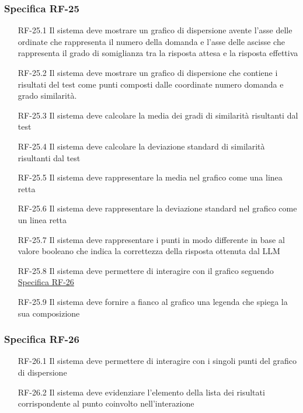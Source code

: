 \subsubsection{Specifica RF-25}
\label{subsubsec:RF-25}
\begin{enumerate}
    \item[RF-25.1] Il sistema deve mostrare un grafico di dispersione avente l'asse delle ordinate che rappresenta il numero della
     domanda e l'asse delle ascisse che rappresenta il grado di somiglianza tra la risposta attesa e la risposta effettiva
    \item[RF-25.2] Il sistema deve mostrare un grafico di dispersione che contiene i risultati del test come punti composti dalle coordinate numero domanda e grado similarità.
    \item[RF-25.3] Il sistema deve calcolare la media dei gradi di similarità risultanti dal test
    \item[RF-25.4] Il sistema deve calcolare la deviazione standard di similarità risultanti dal test
    \item[RF-25.5] Il sistema deve rappresentare la media nel grafico come una linea retta
    \item[RF-25.6] Il sistema deve rappresentare la deviazione standard nel grafico come un linea retta
    \item[RF-25.7] Il sistema deve rappresentare i punti in modo differente in base al valore booleano che indica la correttezza della risposta ottenuta dal LLM
    \item[RF-25.8] Il sistema deve permettere di interagire con il grafico seguendo \hyperref[subsubsec:RF-26]{Specifica RF-26}
    \item[RF-25.9] Il sistema deve fornire a fianco al grafico una legenda che spiega la sua composizione
\end{enumerate}

\subsubsection{Specifica RF-26}
\label{subsubsec:RF-26}
\begin{enumerate}
    \item[RF-26.1] Il sistema deve permettere di interagire con i singoli punti del grafico di dispersione
    \item[RF-26.2] Il sistema deve evidenziare l'elemento della lista dei risultati corrispondente al punto coinvolto nell'interazione
\end{enumerate}




